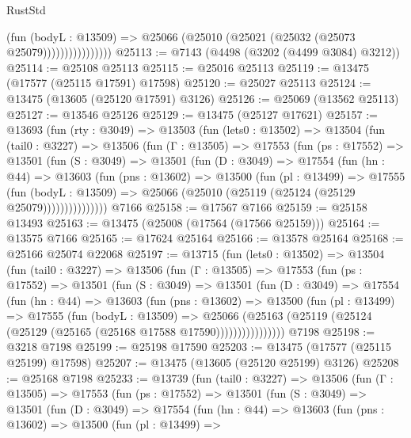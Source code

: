 \begin{lexlean}{RustStd}
\begin{coremodule}
                          (fun (bodyL : @13509) =>
                          @25066 (@25010 (@25021 (@25032 (@25073 @25079))))))))))))))))
@25113 := @7143 (@4498 (@3202 (@4499 @3084) @3212))
@25114 := @25108 @25113
@25115 := @25016 @25113
@25119 := @13475 (@17577 (@25115 @17591) @17598)
@25120 := @25027 @25113
@25124 := @13475 (@13605 (@25120 @17591) @3126)
@25126 := @25069 (@13562 @25113)
@25127 := @13546 @25126
@25129 := @13475 (@25127 @17621)
@25157 := @13693
    (fun (rty : @3049) =>
    @13503
      (fun (lets0 : @13502) =>
      @13504
        (fun (tail0 : @3227) =>
        @13506
          (fun (Γ : @13505) =>
          @17553
            (fun (ps : @17552) =>
            @13501
              (fun (S : @3049) =>
              @13501
                (fun (D : @3049) =>
                @17554
                  (fun (hn : @44) =>
                  @13603
                    (fun (pns : @13602) =>
                    @13500
                      (fun (pl : @13499) =>
                      @17555
                        (fun (bodyL : @13509) =>
                        @25066 (@25010 (@25119 (@25124 (@25129 @25079)))))))))))))))
    @7166
@25158 := @17567 @7166
@25159 := @25158 @13493
@25163 := @13475 (@25008 (@17564 (@17566 @25159)))
@25164 := @13575 @7166
@25165 := @17624 @25164
@25166 := @13578 @25164
@25168 := @25166 @25074 @22068
@25197 := @13715
    (fun (lets0 : @13502) =>
    @13504
      (fun (tail0 : @3227) =>
      @13506
        (fun (Γ : @13505) =>
        @17553
          (fun (ps : @17552) =>
          @13501
            (fun (S : @3049) =>
            @13501
              (fun (D : @3049) =>
              @17554
                (fun (hn : @44) =>
                @13603
                  (fun (pns : @13602) =>
                  @13500
                    (fun (pl : @13499) =>
                    @17555
                      (fun (bodyL : @13509) =>
                      @25066
                        (@25163
                          (@25119 (@25124 (@25129 (@25165 (@25168 @17588 @17590))))))))))))))))
    @7198
@25198 := @3218 @7198
@25199 := @25198 @17590
@25203 := @13475 (@17577 (@25115 @25199) @17598)
@25207 := @13475 (@13605 (@25120 @25199) @3126)
@25208 := @25168 @7198
@25233 := @13739
    (fun (tail0 : @3227) =>
    @13506
      (fun (Γ : @13505) =>
      @17553
        (fun (ps : @17552) =>
        @13501
          (fun (S : @3049) =>
          @13501
            (fun (D : @3049) =>
            @17554
              (fun (hn : @44) =>
              @13603
                (fun (pns : @13602) =>
                @13500
                  (fun (pl : @13499) =>

\end{coremodule}
\end{lexlean}
